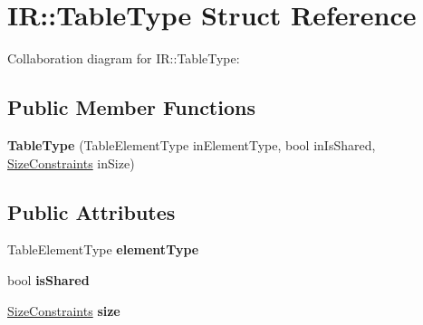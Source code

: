 \hypertarget{struct_i_r_1_1_table_type}{}\section{IR\+:\+:Table\+Type Struct Reference}
\label{struct_i_r_1_1_table_type}


Collaboration diagram for IR\+:\+:Table\+Type\+:
\subsection*{Public Member Functions}
\begin{DoxyCompactItemize}
\item 
\mbox{\label{struct_i_r_1_1_table_type_a0c15e231bcca256d1902b0efeb30c04d}} 
{\bfseries Table\+Type} (Table\+Element\+Type in\+Element\+Type, bool in\+Is\+Shared, \mbox{\hyperlink{struct_i_r_1_1_size_constraints}{Size\+Constraints}} in\+Size)
\end{DoxyCompactItemize}
\subsection*{Public Attributes}
\begin{DoxyCompactItemize}
\item 
\mbox{\label{struct_i_r_1_1_table_type_a32ab498b4ae2c99ce0a3625b41f3dcfe}} 
Table\+Element\+Type {\bfseries element\+Type}
\item 
\mbox{\label{struct_i_r_1_1_table_type_a9f3dfeabbf2074941c57b30832112f6b}} 
bool {\bfseries is\+Shared}
\item 
\mbox{\label{struct_i_r_1_1_table_type_a345f002f5979ae4dd3b7b90ef512e334}} 
\mbox{\hyperlink{struct_i_r_1_1_size_constraints}{Size\+Constraints}} {\bfseries size}
\end{DoxyCompactItemize}
